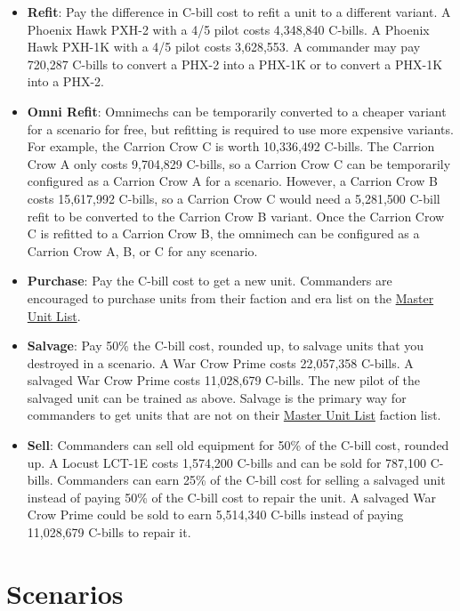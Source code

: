 \documentclass[UTF8]{article}
\begin{document}
\begin{itemize}
\item {\bf Refit}: Pay the difference in C-bill cost to refit a unit to a different variant.
A Phoenix Hawk PXH-2 with a 4/5 pilot costs 4,348,840 C-bills.
A Phoenix Hawk PXH-1K with a 4/5 pilot costs 3,628,553.
A commander may pay 720,287 C-bills to convert a PHX-2 into a PHX-1K or to convert a PHX-1K into a PHX-2.

\item {\bf Omni Refit}: Omnimechs can be temporarily converted to a cheaper variant for a scenario for free, but refitting is required to use more expensive variants.
For example, the Carrion Crow C is worth 10,336,492 C-bills.
The Carrion Crow A only costs 9,704,829 C-bills, so a Carrion Crow C can be temporarily configured as a Carrion Crow A for a scenario.
However, a Carrion Crow B costs 15,617,992 C-bills, so a Carrion Crow C would need a 5,281,500 C-bill refit to be converted to the Carrion Crow B variant.
Once the Carrion Crow C is refitted to a Carrion Crow B, the omnimech can be configured as a Carrion Crow A, B, or C for any scenario.

\item {\bf Purchase}: Pay the C-bill cost to get a new unit.
Commanders are encouraged to purchase units from their faction and era list on the \href{http://www.masterunitlist.info/}{Master Unit List}.

\item {\bf Salvage}: Pay 50\% the C-bill cost, rounded up, to salvage units that you destroyed in a scenario.
A War Crow Prime costs 22,057,358 C-bills.
A salvaged War Crow Prime costs 11,028,679 C-bills.
The new pilot of the salvaged unit can be trained as above.
Salvage is the primary way for commanders to get units that are not on their \href{http://www.masterunitlist.info/}{Master Unit List} faction list.

\item {\bf Sell}: Commanders can sell old equipment for 50\% of the C-bill cost, rounded up.
A Locust LCT-1E costs 1,574,200 C-bills and can be sold for 787,100 C-bills.
Commanders can earn 25\% of the C-bill cost for selling a salvaged unit instead of paying 50\% of the C-bill cost to repair the unit.
A salvaged War Crow Prime could be sold to earn 5,514,340 C-bills instead of paying 11,028,679 C-bills to repair it.

\end{itemize}

\newpage

\section{Scenarios}
\end{document}
